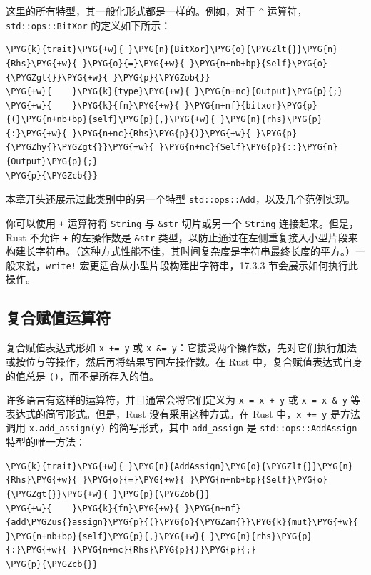 这里的所有特型，其一般化形式都是一样的。例如，对于 \texttt{\textasciicircum{}} 运算符，\texttt{std::ops::BitXor} 的定义如下所示：

\begin{Verbatim}[commandchars=\\\{\},breaklines=true,breakanywhere=true,fontsize=\codefont,xleftmargin=17bp]
\PYG{k}{trait}\PYG{+w}{ }\PYG{n}{BitXor}\PYG{o}{\PYGZlt{}}\PYG{n}{Rhs}\PYG{+w}{ }\PYG{o}{=}\PYG{+w}{ }\PYG{n+nb+bp}{Self}\PYG{o}{\PYGZgt{}}\PYG{+w}{ }\PYG{p}{\PYGZob{}}
\PYG{+w}{    }\PYG{k}{type}\PYG{+w}{ }\PYG{n+nc}{Output}\PYG{p}{;}
\PYG{+w}{    }\PYG{k}{fn}\PYG{+w}{ }\PYG{n+nf}{bitxor}\PYG{p}{(}\PYG{n+nb+bp}{self}\PYG{p}{,}\PYG{+w}{ }\PYG{n}{rhs}\PYG{p}{:}\PYG{+w}{ }\PYG{n+nc}{Rhs}\PYG{p}{)}\PYG{+w}{ }\PYG{p}{\PYGZhy{}\PYGZgt{}}\PYG{+w}{ }\PYG{n+nc}{Self}\PYG{p}{::}\PYG{n}{Output}\PYG{p}{;}
\PYG{p}{\PYGZcb{}}
\end{Verbatim}

本章开头还展示过此类别中的另一个特型 \texttt{std::ops::Add}，以及几个范例实现。

你可以使用 \texttt{+} 运算符将 \texttt{String} 与 \texttt{\&str} 切片或另一个 \texttt{String} 连接起来。但是，Rust 不允许 \texttt{+} 的左操作数是 \texttt{\&str} 类型，以防止通过在左侧重复接入小型片段来构建长字符串。（这种方式性能不佳，其时间复杂度是字符串最终长度的平方。）一般来说，\texttt{write!} 宏更适合从小型片段构建出字符串，17.3.3 节会展示如何执行此操作。

\subsection{复合赋值运算符}

复合赋值表达式形如 \texttt{x += y} 或 \texttt{x \&= y}：它接受两个操作数，先对它们执行加法或按位与等操作，然后再将结果写回左操作数。在 Rust 中，复合赋值表达式自身的值总是 \texttt{()}，而不是所存入的值。

许多语言有这样的运算符，并且通常会将它们定义为 \texttt{x = x + y} 或 \texttt{x = x \& y} 等表达式的简写形式。但是，Rust 没有采用这种方式。在 Rust 中，\texttt{x += y} 是方法调用 \texttt{x.add\_assign(y)} 的简写形式，其中 \texttt{add\_assign} 是 \texttt{std::ops::AddAssign} 特型的唯一方法：

\begin{Verbatim}[commandchars=\\\{\},breaklines=true,breakanywhere=true,fontsize=\codefont,xleftmargin=17bp]
\PYG{k}{trait}\PYG{+w}{ }\PYG{n}{AddAssign}\PYG{o}{\PYGZlt{}}\PYG{n}{Rhs}\PYG{+w}{ }\PYG{o}{=}\PYG{+w}{ }\PYG{n+nb+bp}{Self}\PYG{o}{\PYGZgt{}}\PYG{+w}{ }\PYG{p}{\PYGZob{}}
\PYG{+w}{    }\PYG{k}{fn}\PYG{+w}{ }\PYG{n+nf}{add\PYGZus{}assign}\PYG{p}{(}\PYG{o}{\PYGZam{}}\PYG{k}{mut}\PYG{+w}{ }\PYG{n+nb+bp}{self}\PYG{p}{,}\PYG{+w}{ }\PYG{n}{rhs}\PYG{p}{:}\PYG{+w}{ }\PYG{n+nc}{Rhs}\PYG{p}{)}\PYG{p}{;}
\PYG{p}{\PYGZcb{}}
\end{Verbatim}

